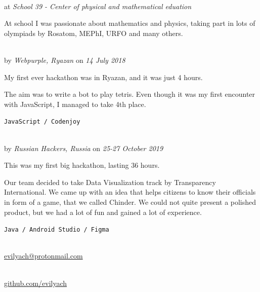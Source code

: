  \\
at \textit{School 39 - Center of physical and mathematical eduation}
\SmallSep

At school I was passionate about mathematics and physics, taking part in lots of olympiads by Rosatom, MEPhI, URFO and many others.

\Sep


 \\
by \textit{Webpurple, Ryazan}
on \textit{14 July 2018}
\SmallSep

My first ever hackathon was in Ryazan, and it was just 4 hours.

The aim was to write a bot to play tetris. Even though it was my first encounter with JavaScript, I managed to take 4th place.
\SmallSep

\texttt{JavaScript / Codenjoy}

\SmallSep

 \\
by \textit{Russian Hackers, Russia}
on \textit{25-27 October 2019}
\SmallSep

This was my first big hackathon, lasting 36 hours.

Our team decided to take Data Visualization track by Transparency International. We came up with an idea that helps citizens to know their officials in form of a game, that we called Chinder. We could not quite present a polished product, but we had a lot of fun and gained a lot of experience.

\texttt{Java / Android Studio / Figma}

\Sep


 \\
\url{evilyach@protonmail.com}

 \\
\url{github.com/evilyach}

\SmallSep